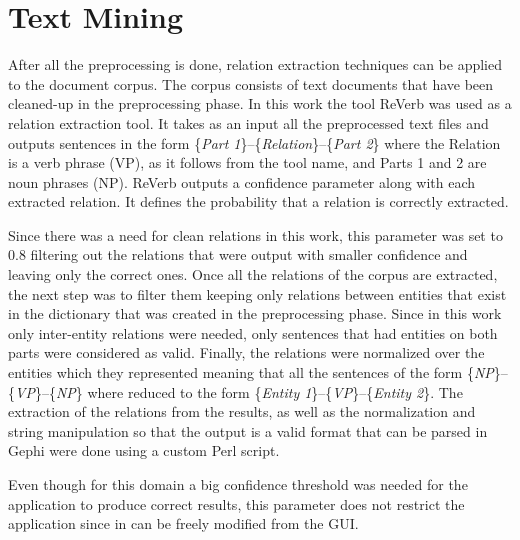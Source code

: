 \documentclass[]{article}
\begin{document}
\section{Text Mining}
%
After all the preprocessing is done, relation extraction techniques can be applied to the document corpus. The corpus consists of text documents that have been cleaned-up in the preprocessing phase. In this work the tool ReVerb was used as a relation extraction tool. It takes as an input all the preprocessed text files and outputs sentences in the form \{\textit{Part 1}\}--\{\textit{Relation}\}--\{\textit{Part 2}\} where the Relation is a verb phrase (VP), as it follows from the tool name, and Parts 1 and 2 are noun phrases (NP). ReVerb outputs a confidence parameter along with each extracted relation. It defines the probability that a relation is correctly extracted. 

Since there was a need for clean relations in this work, this parameter was set to 0.8 filtering out the relations that were output with smaller confidence and leaving only the correct ones. Once all the relations of the corpus are extracted, the next step was to filter them keeping only relations between entities that exist in the dictionary that was created in the preprocessing phase. Since in this work only inter-entity relations were needed, only sentences that had entities on both parts were considered as valid. Finally, the relations were normalized over the entities which they represented meaning that all the sentences of the form \{\textit{NP}\}--\{\textit{VP}\}--\{\textit{NP}\} where reduced to the form \{\textit{Entity 1}\}--\{\textit{VP}\}--\{\textit{Entity 2}\}. The extraction of the relations from the results, as well as the normalization and string manipulation so that the output is a valid format that can be parsed in Gephi were done using a custom Perl script.

Even though for this domain a big confidence threshold was needed for the application to produce correct results, this parameter does not restrict the application since in can be freely modified from the GUI.

%
\end{document}
